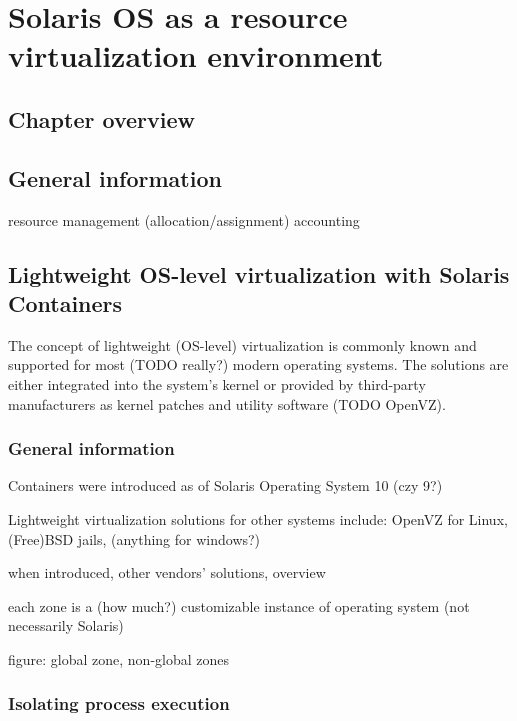 \documentclass[11pt]{book}
\begin{document}
  \chapter{Solaris OS as a resource virtualization environment}

    \section*{Chapter overview}

    \section{General information}

      resource management (allocation/assignment)
      accounting


    \section{Lightweight OS-level virtualization with Solaris Containers}

      The concept of lightweight (OS-level) virtualization is commonly known and supported for most (TODO really?)
      modern operating systems. The solutions are either integrated into the system's kernel or provided by third-party
      manufacturers as kernel patches and utility software (TODO OpenVZ).


      \subsection{General information}
      \label{sub:}

        Containers were introduced as of Solaris Operating System 10 (czy 9?)

        Lightweight virtualization solutions for other systems include: OpenVZ for Linux, (Free)BSD jails, (anything for
        windows?)

        when introduced, other vendors' solutions, overview

        each zone is a (how much?) customizable instance of operating system (not necessarily Solaris)

        figure: global zone, non-global zones


      \subsection{Isolating process execution}
      \label{sub:}
      
\end{document}
